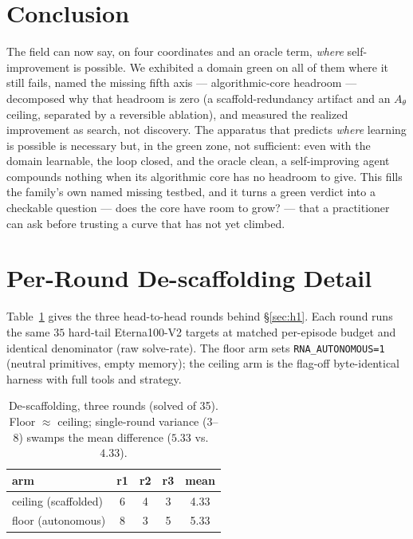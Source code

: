 \documentclass[11pt]{article}
\newcommand{\Ath}{A_{\theta}}
\begin{document}
\section{Conclusion}
The field can now say, on four coordinates and an oracle term, \emph{where} self-improvement is possible.
We exhibited a domain green on all of them where it still fails, named the missing fifth axis ---
algorithmic-core headroom --- decomposed why that headroom is zero (a scaffold-redundancy artifact and an
$\Ath$ ceiling, separated by a reversible ablation), and measured the realized improvement as search, not
discovery. The apparatus that predicts \emph{where} learning is possible is necessary but, in the green
zone, not sufficient: even with the domain learnable, the loop closed, and the oracle clean, a
self-improving agent compounds nothing when its algorithmic core has no headroom to give. This fills the
family's own named missing testbed, and it turns a green verdict into a checkable question --- does the
core have room to grow? --- that a practitioner can ask before trusting a curve that has not yet climbed.

\appendix
\section{Per-Round De-scaffolding Detail}\label{app:descaffold}
Table~\ref{tab:rounds} gives the three head-to-head rounds behind \S\ref{sec:h1}. Each round runs the
same $35$ hard-tail Eterna100-V2 targets at matched per-episode budget and identical denominator (raw
solve-rate). The floor arm sets \texttt{RNA\_AUTONOMOUS=1} (neutral primitives, empty memory); the
ceiling arm is the flag-off byte-identical harness with full tools and strategy.

\begin{table}[h]\centering\small
\caption{De-scaffolding, three rounds (solved of 35). Floor $\approx$ ceiling; single-round variance
($3$--$8$) swamps the mean difference ($5.33$ vs.\ $4.33$).}
\label{tab:rounds}
\begin{tabular}{@{}lcccc@{}}
\toprule
arm & r1 & r2 & r3 & mean\\
\midrule
ceiling (scaffolded) & 6 & 4 & 3 & 4.33\\
floor (autonomous)   & 8 & 3 & 5 & 5.33\\
\bottomrule
\end{tabular}
\end{table}
\end{document}
